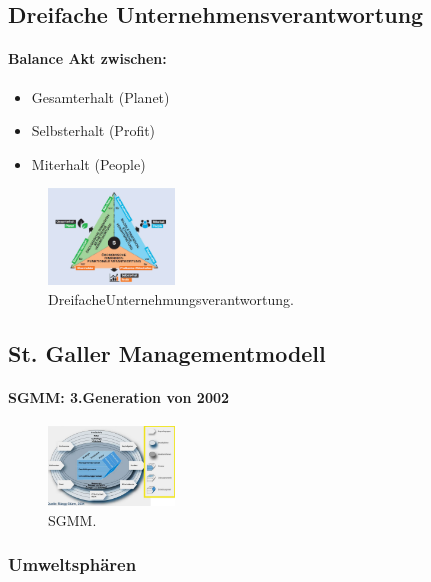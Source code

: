 \documentclass{article}
\begin{document}
\subsection{Dreifache Unternehmensverantwortung}
\paragraph{Balance Akt zwischen:} 

\begin{itemize}
\item Gesamterhalt (Planet)
\item Selbsterhalt (Profit)
\item Miterhalt (People)
\end{itemize}

\begin{figure}
\centering
\includegraphics[width=0.3\textwidth]{Resources/Image/Dreifache Unternehmungsveratntwortung.png}
\caption{\label{fig:DreifacheUnternehmungsverantwortung}DreifacheUnternehmungsverantwortung.}
\end{figure}


\subsection{St. Galler Managementmodell}

\paragraph{SGMM: 3.Generation von 2002}

\begin{figure}
\centering
\includegraphics[width=0.3\textwidth]{Resources/Image/SGMM.png}
\caption{\label{fig:SGMM}SGMM.}
\end{figure}

\subsubsection{Umweltsphären}
\end{document}

